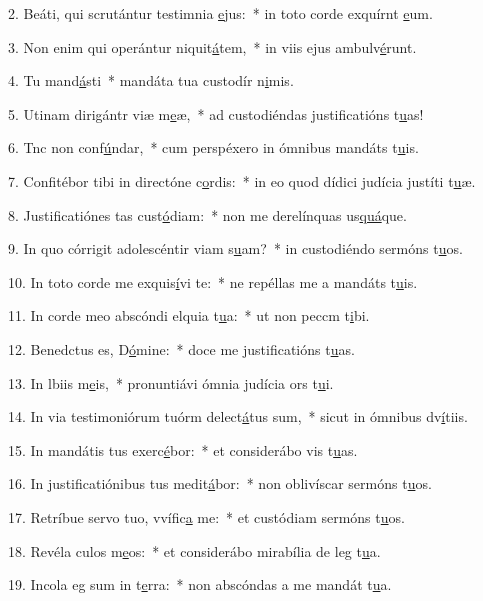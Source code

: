 2. Beáti, qui scrutántur testimnia \uline{e}jus:~* in toto corde exquírnt \uline{e}um.\par 
3. Non enim qui operántur niquit\uline{á}tem,~* in viis ejus ambulv\uline{é}runt.\par 
4. Tu mand\uline{á}sti~* mandáta tua custodír n\uline{i}mis.\par 
5. Utinam dirigántr viæ m\uline{e}æ,~* ad custodiéndas justificatións t\uline{u}as!\par 
6. Tnc non conf\uline{ú}ndar,~* cum perspéxero in ómnibus mandáts t\uline{u}is.\par 
7. Confitébor tibi in directóne c\uline{o}rdis:~* in eo quod dídici judícia justíti t\uline{u}æ.\par 
8. Justificatiónes tas cust\uline{ó}diam:~* non me derelínquas us\uline{quá}que.\par 
9. In quo córrigit adolescéntir viam s\uline{u}am?~* in custodiéndo sermóns t\uline{u}os.\par 
10. In toto corde me exquis\uline{í}vi te:~* ne repéllas me a mandáts t\uline{u}is.\par 
11. In corde meo abscóndi elquia t\uline{u}a:~* ut non peccm t\uline{i}bi.\par 
12. Benedctus es, D\uline{ó}mine:~* doce me justificatións t\uline{u}as.\par 
13. In lbiis m\uline{e}is,~* pronuntiávi ómnia judícia ors t\uline{u}i.\par 
14. In via testimoniórum tuórm delect\uline{á}tus sum,~* sicut in ómnibus dv\uline{í}tiis.\par 
15. In mandátis tus exerc\uline{é}bor:~* et considerábo vis t\uline{u}as.\par 
16. In justificatiónibus tus medit\uline{á}bor:~* non oblivíscar sermóns t\uline{u}os.\par 
17. Retríbue servo tuo, vvífic\uline{a} me:~* et custódiam sermóns t\uline{u}os.\par 
18. Revéla culos m\uline{e}os:~* et considerábo mirabília de leg t\uline{u}a.\par 
19. Incola eg sum in t\uline{e}rra:~* non abscóndas a me mandát t\uline{u}a.\par 
